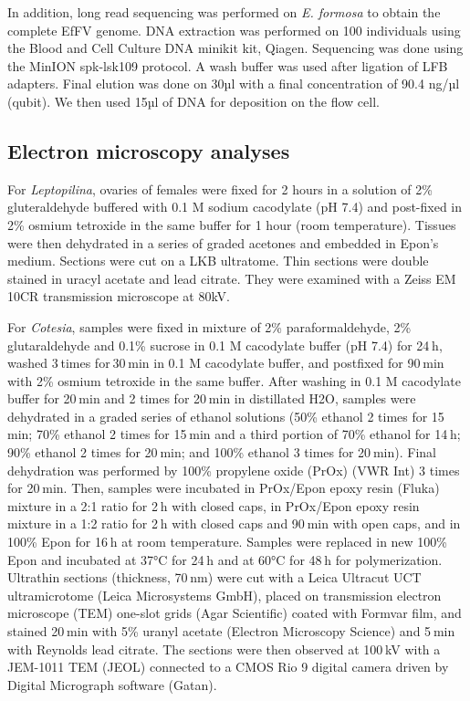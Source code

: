 In addition, long read sequencing was performed on \textit{E. formosa} to obtain the complete EfFV genome. DNA extraction was performed on 100 individuals using the Blood and Cell Culture DNA minikit kit, Qiagen. Sequencing was done using the MinION spk-lsk109 protocol. A wash buffer was used after ligation of LFB adapters. Final elution was done on 30µl with a final concentration of 90.4 ng/µl (qubit). We then used 15µl of DNA for deposition on the flow cell. 


\subsection{Electron microscopy analyses}

For \textit{Leptopilina}, ovaries of females were fixed for 2 hours in a solution of 2\% gluteraldehyde buffered with 0.1 M sodium cacodylate (pH 7.4) and post-fixed in 2\% osmium tetroxide in the same buffer for 1 hour (room temperature). Tissues were then dehydrated in a series of graded acetones and embedded in Epon’s medium. Sections were cut on a LKB ultratome. Thin sections were double stained in uracyl acetate and lead citrate. They were examined with a Zeiss EM 10CR transmission microscope at 80kV. 

For \textit{Cotesia}, samples were fixed in mixture of 2\% paraformaldehyde, 2\% glutaraldehyde and 0.1\% sucrose in 0.1 M cacodylate buffer (pH 7.4) for 24 h, washed 3 times for 30 min in 0.1 M cacodylate buffer, and postfixed for 90 min with 2\% osmium tetroxide in the same buffer. After washing in 0.1 M cacodylate buffer for 20 min and 2 times for 20 min in distillated H2O, samples were dehydrated in a graded series of ethanol solutions (50\% ethanol 2 times for 15 min; 70\% ethanol 2 times for 15 min and a third portion of 70\% ethanol for 14 h; 90\% ethanol 2 times for 20 min; and 100\% ethanol 3 times for 20 min). Final dehydration was performed by 100\% propylene oxide (PrOx) (VWR Int) 3 times for 20 min. Then, samples were incubated in PrOx/Epon epoxy resin (Fluka) mixture in a 2:1 ratio for 2 h with closed caps, in PrOx/Epon epoxy resin mixture in a 1:2 ratio for 2 h with closed caps and 90 min with open caps, and in 100\% Epon for 16 h at room temperature. Samples were replaced in new 100\% Epon and incubated at 37°C for 24 h and at 60°C for 48 h for polymerization. Ultrathin sections (thickness, 70 nm) were cut with a Leica Ultracut UCT ultramicrotome (Leica Microsystems GmbH), placed on transmission electron microscope (TEM) one-slot grids (Agar Scientific) coated with Formvar film, and stained 20 min with 5\% uranyl acetate (Electron Microscopy Science) and 5 min with Reynolds lead citrate. The sections were then observed at 100 kV with a JEM-1011 TEM (JEOL) connected to a CMOS Rio 9 digital camera driven by Digital Micrograph software (Gatan). 

